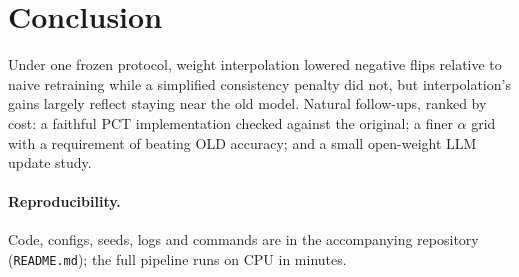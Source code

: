 \documentclass[acmsmall,screen]{acmart}
\begin{document}
\section{Conclusion}
Under one frozen protocol, weight interpolation lowered negative flips relative to naive retraining while a simplified consistency penalty did not, but interpolation's gains largely reflect staying near the old model. Natural follow-ups, ranked by cost: a faithful PCT implementation checked against the original; a finer $\alpha$ grid with a requirement of beating OLD accuracy; and a small open-weight LLM update study.

\paragraph{Reproducibility.} Code, configs, seeds, logs and commands are in the accompanying repository (\texttt{README.md}); the full pipeline runs on CPU in minutes.



\end{document}
